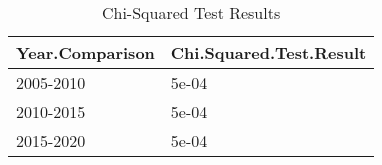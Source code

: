 \begin{table}

\caption{Chi-Squared Test Results}
\centering
\begin{tabular}[t]{ll}
\toprule
Year.Comparison & Chi.Squared.Test.Result\\
\midrule
2005-2010 & 5e-04\\
2010-2015 & 5e-04\\
2015-2020 & 5e-04\\
\bottomrule
\end{tabular}
\end{table}